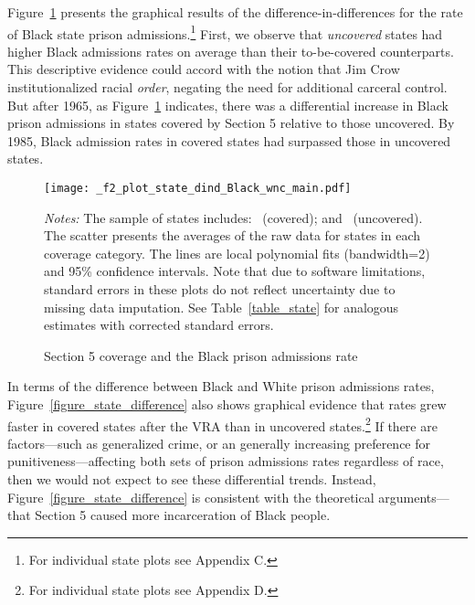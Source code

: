 \documentclass[12pt]{article}
\begin{document}
Figure~\ref{figure_state_section5} presents the graphical results of the difference-in-differences for the rate of Black state prison admissions.\footnote{For individual state plots see Appendix C.}  First, we observe that \emph{uncovered} states had higher Black admissions rates on average than their to-be-covered counterparts.  This descriptive evidence could accord with the notion that Jim Crow institutionalized racial \emph{order}, negating the need for additional carceral control.  But after 1965, as Figure~\ref{figure_state_section5} indicates, there was a differential increase in Black prison admissions in states covered by Section 5 relative to those uncovered.  By 1985, Black admission rates in covered states had surpassed those in uncovered states.




\begin{figure}[t!]
	\begin{center}
	\caption{Section 5 coverage and the Black prison admissions rate}
		\small \vspace*{.05in}
		\smallskip
				\texttt{[image: \_f2\_plot\_state\_dind\_Black\_wnc\_main.pdf]}
		\label{figure_state_section5}
		\end{center}
	\scriptsize{\emph{Notes:} The sample of states includes: \unskip~(covered); and \unskip~(uncovered).  The scatter presents the averages of the raw data for states in each coverage category.  The lines are local polynomial fits (bandwidth=2) and 95\% confidence intervals. Note that due to software limitations, standard errors in these plots do not reflect uncertainty due to missing data imputation. See Table~\ref{table_state} for analogous estimates with corrected standard errors.}
\end{figure} \normalsize


In terms of the difference between Black and White prison admissions rates, Figure~\ref{figure_state_difference} also shows graphical evidence that rates grew faster in covered states after the VRA than in uncovered states.\footnote{For individual state plots see Appendix D.} If there are factors---such as generalized crime, or an generally increasing preference for punitiveness---affecting both sets of prison admissions rates regardless of race, then we would not expect to see these differential trends. Instead, Figure~\ref{figure_state_difference} is consistent with the theoretical arguments---that Section 5 caused more incarceration of Black people.
\end{document}

